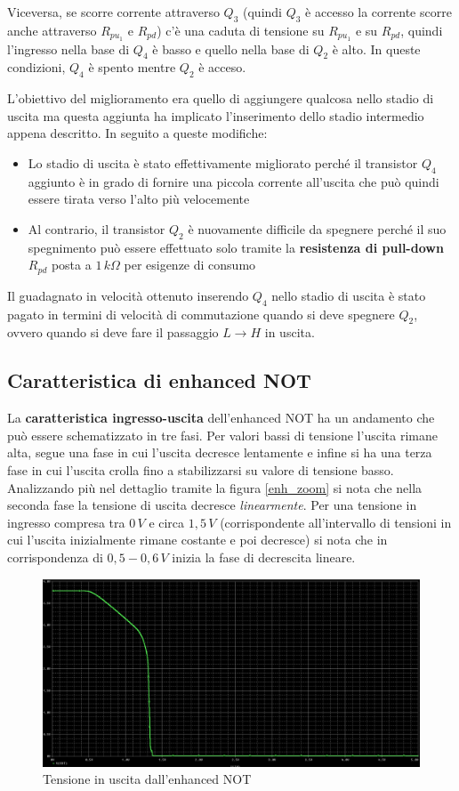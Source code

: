 \documentclass[12pt, a4paper]{report}
\begin{document}
Viceversa, se scorre corrente attraverso $Q_3$ (quindi $Q_3$ è accesso la corrente scorre anche attraverso $R_{pu_1}$ e $R_{pd}$) c'è una caduta di tensione su $R_{pu_1}$ e su $R_{pd}$, quindi l'ingresso nella base di $Q_4$ è basso e quello nella base di $Q_2$ è alto. In queste condizioni, $Q_4$ è spento mentre $Q_2$ è acceso.

L'obiettivo del miglioramento era quello di aggiungere qualcosa nello stadio di uscita ma questa aggiunta ha implicato l'inserimento dello stadio intermedio appena descritto. In seguito a queste modifiche:
\begin{itemize}
    \item Lo stadio di uscita è stato effettivamente migliorato perché il transistor $Q_4$ aggiunto è in grado di fornire una piccola corrente all'uscita che può quindi essere tirata verso l'alto più velocemente
    \item Al contrario, il transistor $Q_2$ è nuovamente difficile da spegnere perché il suo spegnimento può essere effettuato solo tramite la \textbf{resistenza di pull-down} $R_{pd}$ posta a $1\,k\Omega$ per esigenze di consumo
\end{itemize}
Il guadagnato in velocità ottenuto inserendo $Q_4$ nello stadio di uscita è stato pagato in termini di velocità di commutazione quando si deve spegnere $Q_2$, ovvero quando si deve fare il passaggio $L \rightarrow H$ in uscita.

\subsection{Caratteristica di enhanced NOT}
La \textbf{caratteristica ingresso-uscita} dell'enhanced NOT ha un andamento che può essere schematizzato in tre fasi. Per valori bassi di tensione l'uscita rimane alta, segue una fase in cui l'uscita decresce lentamente e infine si ha una terza fase in cui l'uscita crolla fino a stabilizzarsi su valore di tensione basso. Analizzando più nel dettaglio tramite la figura \ref{enh_zoom} si nota che nella seconda fase la tensione di uscita decresce \textit{linearmente}. Per una tensione in ingresso compresa tra $0\,V$ e circa $1,5\,V$ (corrispondente all'intervallo di tensioni in cui l'uscita inizialmente rimane costante e poi decresce) si nota che in corrispondenza di $0,5 - 0,6\,V$ inizia la fase di decrescita lineare.
\begin{figure}[h]
    \centering
    \includegraphics[scale=0.35,angle=0]{ttl_not_enh_transfer.png}
    \caption{Tensione in uscita dall'enhanced NOT}
\end{figure}
\end{document}
